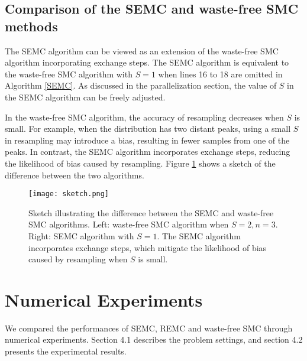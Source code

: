 \documentclass[12pt]{article}
\begin{document}
\subsection{Comparison of the SEMC and waste-free SMC methods}


The SEMC algorithm can be viewed as an extension of the waste-free SMC algorithm incorporating exchange steps.
The SEMC algorithm is equivalent to the waste-free SMC algorithm with $S = 1$ when lines 16 to 18 are omitted in Algorithm \ref{SEMC}.
As discussed in the parallelization section, the value of $S$ in the SEMC algorithm can be freely adjusted. \par

In the waste-free SMC algorithm, the accuracy of resampling decreases when $S$ is small.
For example, when the distribution has two distant peaks, using a small $S$ in resampling may introduce a bias, resulting in fewer samples from one of the peaks.
In contrast, the SEMC algorithm incorporates exchange steps, reducing the likelihood of bias caused by resampling.
Figure \ref{fig:sketch} shows a sketch of the difference between the two algorithms. \par

\begin{figure}[h]
  \centering
  \texttt{[image: sketch.png]}
  \caption{Sketch illustrating the difference between the SEMC and waste-free SMC algorithms.
  Left: waste-free SMC algorithm when $S = 2, n = 3$. Right: SEMC algorithm with $S = 1$.
  The SEMC algorithm incorporates exchange steps, which mitigate the likelihood of bias caused by resampling when $S$ is small.}
  \label{fig:sketch}
\end{figure}

\section{Numerical Experiments}
We compared the performances of SEMC, REMC and waste-free SMC through numerical experiments.
Section 4.1 describes the problem settings, and section 4.2 presents the experimental results.
\end{document}
